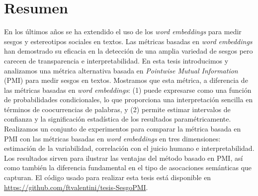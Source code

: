 
\chapter*{Resumen}

En los últimos años se ha extendido el uso de los \emph{word embeddings} para medir sesgos y estereotipos sociales en textos. Las métricas basadas en \emph{word embeddings} han demostrado su eficacia en la detección de una amplia variedad de sesgos pero carecen de transparencia e interpretabilidad. En esta tesis introducimos y analizamos una métrica alternativa basada en \emph{Pointwise Mutual Information} (PMI) para medir sesgos en textos. Mostramos que esta métrica, a diferencia de las métricas basadas en \emph{word embeddings}: (1) puede expresarse como una función de probabilidades condicionales, lo que proporciona una interpretación sencilla en términos de coocurrencias de palabras, y (2) permite estimar intervalos de confianza y la significación estadística de los resultados paramétricamente. Realizamos un conjunto de experimentos para comparar la métrica basada en PMI con las métricas basadas en \emph{word embeddings} en tres dimensiones: estimación de la variabilidad, correlación con el juicio humano e interpretabilidad. Los resultados sirven para ilustrar las ventajas del método basado en PMI, así como también la diferencia fundamental en el tipo de asocaciones semánticas que capturan. El código usado para realizar esta tesis está disponible en \url{https://github.com/ftvalentini/tesis-SesgoPMI}.

